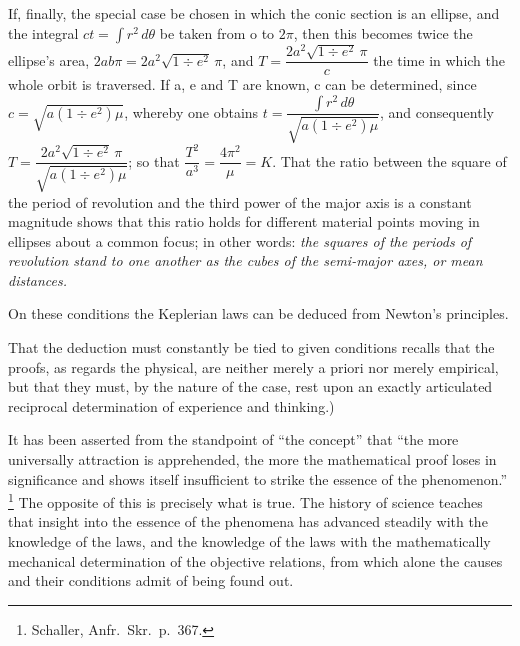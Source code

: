 \documentclass[12pt,a4paper]{book}
\begin{document}
{If, finally, the special case be chosen in which the conic section is an ellipse, and the integral
$ct = \int r^{2}\, d\theta $ be taken from o to $2\pi $, then this becomes twice the ellipse's area,
$2 ab\pi = 2a^{2} \sqrt{1 \div e^{2}}\, \pi $, and
$T = \dfrac{2 a^{2} \sqrt{1 \div e^{2}}\, \pi}{c}$ the time in which the whole orbit is traversed. If
a, e and T are known, c can be determined, since $c = \sqrt{a (1 \div e^{2}) \mu}$, whereby one obtains
$t = \dfrac{\int r^{2}\, d\theta}{\sqrt{a (1 \div e^{2}) \mu}}$, and consequently
$T = \dfrac{2 a^{2} \sqrt{1 \div e^{2}}\, \pi}{\sqrt{a (1 \div e^{2}) \mu}}$;
so that $\dfrac{T^{2}}{a^{3}} = \dfrac{4\pi^{2}}{\mu} = K$.
That the ratio between the square of the period of revolution and the third power of the major axis is
a constant magnitude shows that this ratio holds for different material points moving in ellipses about
a common focus; in other words: \emph{the squares of the periods of revolution stand to one another as
the cubes of the semi-major axes, or mean distances.}

On these conditions the Keplerian laws can be deduced from Newton's principles.}
That the deduction must constantly be tied to
given conditions recalls that the proofs, as regards the physical, are neither merely a priori nor
merely empirical, but that they must, by the nature of the case, rest upon an exactly articulated
reciprocal determination of experience and thinking.)

It has been asserted from the standpoint of ``the concept'' that ``the more universally attraction is
apprehended, the more the mathematical proof loses in significance and shows itself insufficient to
strike the essence of the phenomenon.''%
\footnote{%
Schaller, Anfr.\ Skr.\ p.\ 367.}
The opposite of this is precisely what is true. The history of science teaches that insight into the
essence of the phenomena has advanced steadily with the knowledge of the laws, and the knowledge of the
laws with the mathematically mechanical determination of the objective relations, from which alone the
causes and their conditions admit of being found out.
\end{document}

